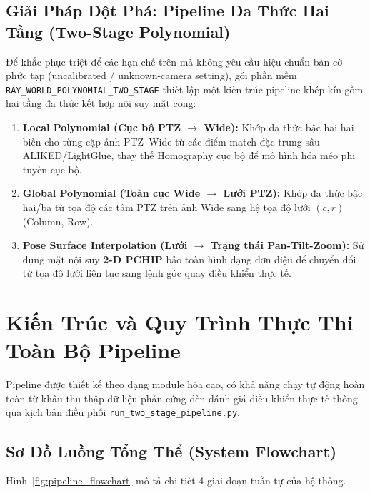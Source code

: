 \documentclass[11pt,a4paper]{article}
\begin{document}
\subsection{Giải Pháp Đột Phá: Pipeline Đa Thức Hai Tầng (Two-Stage Polynomial)}
Để khắc phục triệt để các hạn chế trên mà không yêu cầu hiệu chuẩn bàn cờ phức tạp (uncalibrated / unknown-camera setting), gói phần mềm \texttt{RAY\_WORLD\_POLYNOMIAL\_TWO\_STAGE} thiết lập một kiến trúc pipeline khép kín gồm hai tầng đa thức kết hợp nội suy mặt cong:
\begin{enumerate}[label=\textbf{Tầng \arabic*:}]
    \item \textbf{Local Polynomial (Cục bộ PTZ $\to$ Wide):} Khớp đa thức bậc hai hai biến cho từng cặp ảnh PTZ--Wide từ các điểm match đặc trưng sâu ALIKED/LightGlue, thay thế Homography cục bộ để mô hình hóa méo phi tuyến cục bộ.
    \item \textbf{Global Polynomial (Toàn cục Wide $\to$ Lưới PTZ):} Khớp đa thức bậc hai/ba từ tọa độ các tâm PTZ trên ảnh Wide sang hệ tọa độ lưới $(c, r)$ (Column, Row).
    \item \textbf{Pose Surface Interpolation (Lưới $\to$ Trạng thái Pan-Tilt-Zoom):} Sử dụng mặt nội suy \textbf{2-D PCHIP} bảo toàn hình dạng đơn điệu để chuyển đổi từ tọa độ lưới liên tục sang lệnh góc quay điều khiển thực tế.
\end{enumerate}

\section{Kiến Trúc và Quy Trình Thực Thi Toàn Bộ Pipeline}

Pipeline được thiết kế theo dạng module hóa cao, có khả năng chạy tự động hoàn toàn từ khâu thu thập dữ liệu phần cứng đến đánh giá điều khiển thực tế thông qua kịch bản điều phối \texttt{run\_two\_stage\_pipeline.py}.

\subsection{Sơ Đồ Luồng Tổng Thể (System Flowchart)}

Hình~\ref{fig:pipeline_flowchart} mô tả chi tiết 4 giai đoạn tuần tự của hệ thống.
\end{document}
